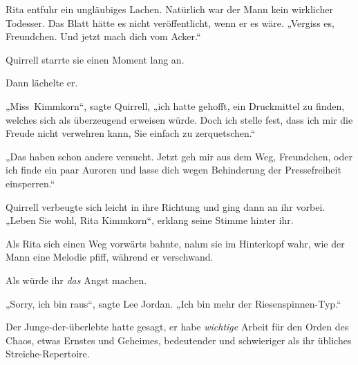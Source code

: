 Rita entfuhr ein ungläubiges Lachen. Natürlich war der Mann kein wirklicher Todesser. Das Blatt hätte es nicht veröffentlicht, wenn er es wäre.
„Vergiss es, Freundchen. Und jetzt mach dich vom Acker.“

Quirrell starrte sie einen Moment lang an.

Dann lächelte er.

„Miss~Kimmkorn“, sagte Quirrell, „ich hatte gehofft, ein Druckmittel zu finden, welches sich als überzeugend erweisen würde. Doch ich stelle fest, dass ich mir die Freude nicht verwehren kann, Sie einfach zu zerquetschen.“

„Das haben schon andere versucht. Jetzt geh mir aus dem Weg, Freundchen, oder ich finde ein paar Auroren und lasse dich wegen Behinderung der Pressefreiheit einsperren.“

Quirrell verbeugte sich leicht in ihre Richtung und ging dann an ihr vorbei.
„Leben Sie wohl, Rita Kimmkorn“, erklang seine Stimme hinter ihr.

Als Rita sich einen Weg vorwärts bahnte, nahm sie im Hinterkopf wahr, wie der Mann eine Melodie pfiff, während er verschwand.

Als würde ihr \emph{das} Angst machen.


„Sorry, ich bin raus“, sagte Lee Jordan.
„Ich bin mehr der Riesenspinnen-Typ.“

Der Junge-der-überlebte hatte gesagt, er habe \emph{wichtige} Arbeit für den Orden des Chaos, etwas Ernstes und Geheimes, bedeutender und schwieriger als ihr übliches Streiche-Repertoire.

